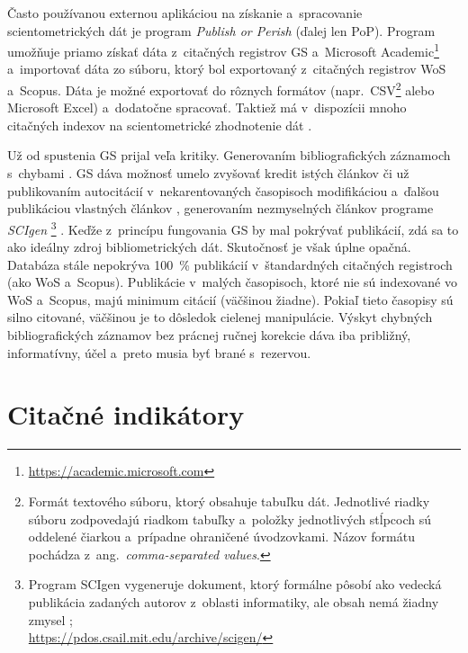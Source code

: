 Často používanou externou aplikáciou na získanie a~spracovanie scientometrických
dát je program \emph{Publish or Perish} (ďalej
len PoP).  Program umožňuje priamo získať dáta z~citačných registrov GS
a~Microsoft Academic\footnote{\url{https://academic.microsoft.com}} a~importovať
dáta zo súboru, ktorý bol exportovaný z~citačných registrov WoS a~Scopus.  Dáta
je možné exportovať do rôznych formátov (napr.~CSV\footnote{Formát textového
  súboru, ktorý obsahuje tabuľku dát.  Jednotlivé riadky súboru zodpovedajú
  riadkom tabuľky a~položky jednotlivých stĺpcoch sú oddelené čiarkou a~prípadne
  ohraničené úvodzovkami.  Názov formátu pochádza z~ang.~\emph{comma-separated
    values}.} alebo Microsoft Excel) a~dodatočne spracovať.  Taktiež má
v~dispozícii mnoho citačných indexov na scientometrické zhodnotenie dát
\citep{Harzing2011}.

Už od spustenia GS prijal veľa kritiky.  Generovaním bibliografických záznamoch
s~chybami \citep{Jacso2009,Jacso2010}.  GS dáva možnosť umelo zvyšovať kredit
istých článkov či už publikovaním autocitácií v~nekarentovaných časopisoch
modifikáciou a~ďalšou publikáciou vlastných článkov \citep{Beel2010b},
generovaním nezmyselných článkov programe \emph{SCIgen}%
\footnote{Program SCIgen vygeneruje dokument,
  ktorý formálne pôsobí ako vedecká publikácia zadaných autorov z~oblasti
  informatiky, ale obsah nemá žiadny zmysel
  \citep{Labbe2013};\\\url{https://pdos.csail.mit.edu/archive/scigen/}}
\citep{Beel2010a}.  Keďže z~princípu fungovania GS by mal pokrývať publikácií,
zdá sa to ako ideálny zdroj bibliometrických dát.  Skutočnosť je však úplne
opačná.  Databáza stále nepokrýva 100~\% publikácií v~štandardných citačných
registroch (ako WoS a~Scopus).  Publikácie v~malých časopisoch, ktoré nie sú
indexované vo WoS a~Scopus, majú minimum citácií (väčšinou žiadne).  Pokiaľ
tieto časopisy sú silno citované, väčšinou je to dôsledok cielenej manipulácie.
Výskyt chybných bibliografických záznamov bez prácnej ručnej korekcie dáva iba
približný, informatívny, účel a~preto musia byť brané s~rezervou.


\section{Citačné indikátory}
\label{sec:indicators}

